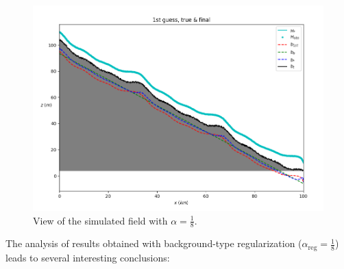 \documentclass{article}
\begin{document}
\begin{figure}[H]
    \begin{minipage}[b]{0.6\linewidth}
        \centering
        \includegraphics[width=\linewidth]{Images_Ayoub/With_Regularisation/Alpha_Const/Graphs/View.png}
        \caption{View of the simulated field with \( \alpha = \frac{1}{8} \).}
        \label{fig:wr-view}
    \end{minipage}
\end{figure}

The analysis of results obtained with background-type regularization (\( \alpha_{\text{reg}} = \frac{1}{8} \)) leads to several interesting conclusions:
\end{document}
